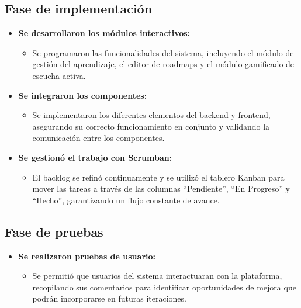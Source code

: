 \subsection{Fase de implementación}

\begin{itemize}
    \item \textbf{Se desarrollaron los módulos interactivos:}
    \begin{itemize}
        \item Se programaron las funcionalidades del sistema, incluyendo el módulo de gestión del aprendizaje, el editor de roadmaps y el módulo gamificado de escucha activa.
    \end{itemize}

    \item \textbf{Se integraron los componentes:}
    \begin{itemize}
        \item Se implementaron los diferentes elementos del backend y frontend, asegurando su correcto funcionamiento en conjunto y validando la comunicación entre los componentes.
    \end{itemize}

    \item \textbf{Se gestionó el trabajo con Scrumban:}
    \begin{itemize}
        \item El backlog se refinó continuamente y se utilizó el tablero Kanban para mover las tareas a través de las columnas “Pendiente”, “En Progreso” y “Hecho”, garantizando un flujo constante de avance.
    \end{itemize}
\end{itemize}

\subsection{Fase de pruebas}

\begin{itemize}
    \item \textbf{Se realizaron pruebas de usuario:}
    \begin{itemize}
        \item Se permitió que usuarios del sistema interactuaran con la plataforma, recopilando sus comentarios para identificar oportunidades de mejora que podrán incorporarse en futuras iteraciones.
    \end{itemize}
\end{itemize}